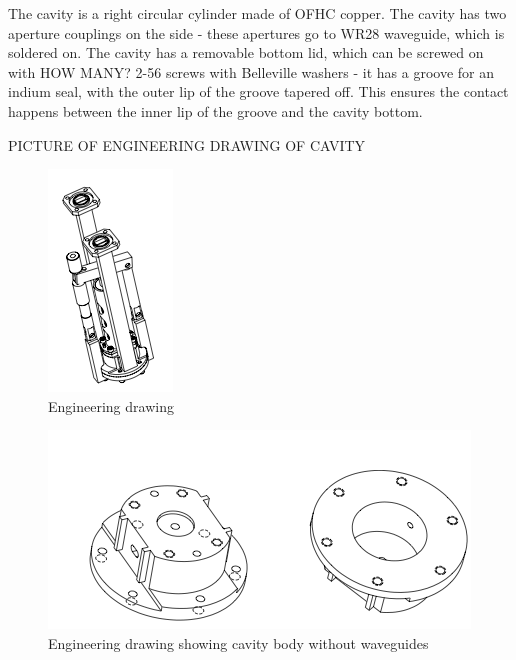 \documentclass[11pt]{article}
\begin{document}
The cavity is a right circular cylinder made of OFHC copper. The cavity has two aperture couplings on the side - these apertures go to WR28 waveguide, which is soldered on. The cavity has a removable bottom lid, which can be screwed on with HOW MANY? 2-56 screws with Belleville washers - it has a groove for an indium seal, with the outer lip of the groove tapered off. This ensures the contact happens between the inner lip of the groove and the cavity bottom.

PICTURE OF ENGINEERING DRAWING OF CAVITY
\begin{figure}
\includegraphics[scale=1]{AxionDrawing3D}
\caption{Engineering drawing}
\end{figure}

\begin{figure}
\includegraphics[scale=0.7]{AxionBody}
\caption{Engineering drawing showing cavity body without waveguides}
\end{figure}
\end{document}
